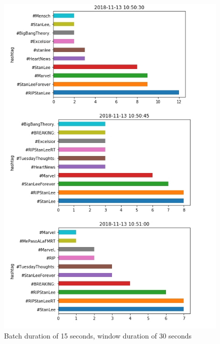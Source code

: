 \documentclass[12pt,a4paper]{article}
\begin{document}
\begin{figure}[H]
    \centering
    \includegraphics[width=12cm]{ouput1-30sec.jpg}
    \caption{Batch duration of 15 seconds, window duration of 30 seconds}
    \label{fig:my_label}
\end{figure}
\end{document}
